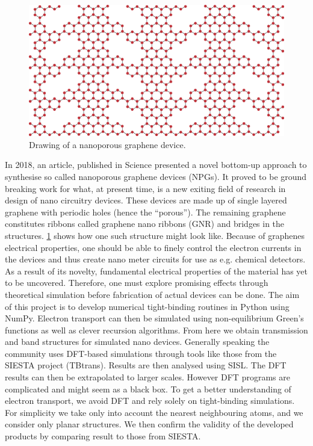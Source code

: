\begin{figure}
	\vspace{-1em}
	\centering
	\includegraphics[width=.4\textwidth]{Figures/NPGintroGraphic.eps}
	\caption{Drawing of a nanoporous graphene device.}\label{introGraphic}
\end{figure}
In 2018, an article\cite{Moreno199}, published in Science presented a novel bottom-up approach to synthesise so called nanoporous graphene devices (NPGs). It proved to be ground breaking work for what, at present time, is a new exiting field of research in design of nano circuitry devices. These devices are made up of single layered graphene with periodic holes (hence the ``porous''). The remaining graphene constitutes ribbons called graphene nano ribbons (GNR) and bridges in the structures. \cref{introGraphic} shows how one such structure might look like.
Because of graphenes electrical properties\cite{calogero_electron_2019}, one should be able to finely control the electron currents in the devices and thus create nano meter circuits for use as e.g. chemical detectors. As a result of its novelty, fundamental electrical properties of the material has yet to be uncovered. Therefore, one must explore promising effects through theoretical simulation before fabrication of actual devices can be done.\newline
The aim of this project is to develop numerical tight-binding routines in Python using NumPy. Electron transport can then be simulated using non-equilibrium Green's functions as well as clever recursion algorithms. From here we obtain transmission and band structures for simulated nano devices.\newline
Generally speaking the community uses DFT-based simulations through tools like those from the SIESTA\cite{Soler_2002} project (TBtrans). Results are then analysed using SISL\cite{zerothi_sisl}. The DFT results can then be extrapolated to larger scales\cite{calogero_electron_2019}. However DFT programs are complicated and might seem as a black box. To get a better understanding of electron transport, we avoid DFT and rely solely on tight-binding simulations. For simplicity we take only into account the nearest neighbouring atoms, and we consider only planar structures.  We then confirm the validity of the developed products by comparing result to those from SIESTA.\newline
